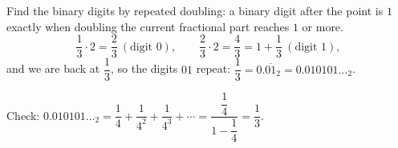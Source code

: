 Find the binary digits by repeated doubling: a binary digit after the point is $1$ exactly when doubling the current fractional part reaches $1$ or more.
\[
\dfrac{1}{3}\cdot2=\dfrac{2}{3}\ (\text{digit }0),\qquad \dfrac{2}{3}\cdot2=\dfrac{4}{3}=1+\dfrac{1}{3}\ (\text{digit }1),
\]
and we are back at $\dfrac{1}{3}$, so the digits $01$ repeat: $\dfrac{1}{3}=\boxed{0.\overline{01}_2}=0.010101\ldots_2$.

Check: $0.010101\ldots_2=\dfrac{1}{4}+\dfrac{1}{4^2}+\dfrac{1}{4^3}+\cdots=\dfrac{\dfrac{1}{4}}{1-\dfrac{1}{4}}=\dfrac{1}{3}$.
